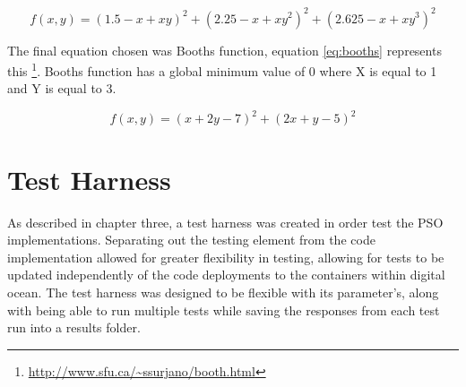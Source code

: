 \documentclass[oneside,12pt]{book}
\begin{document}
\begin{equation}\label{eq:beale}
f(x, y) = (1.5-x+xy)^2+(2.25-x+xy^2)^2+(2.625-x+xy^3)^2
\end{equation}

The final equation chosen was Booths function, equation \ref{eq:booths} represents this \footnote{\url{http://www.sfu.ca/~ssurjano/booth.html}}. Booths function has a global minimum value of 0 where X is equal to 1 and Y is equal to 3. 

\begin{equation}\label{eq:booths}
f(x,y)=(x+2y-7)^2+(2x+y-5)^2
\end{equation}


\section{Test Harness}
As described in chapter three, a test harness was created in order test the PSO implementations. Separating out the testing element from the code implementation allowed for greater flexibility in testing, allowing for tests to be updated independently of the code deployments to the containers within digital ocean. The test harness was designed to be flexible with its parameter's, along with being able to run multiple tests while saving the responses from each test run into a results folder.
\end{document}
